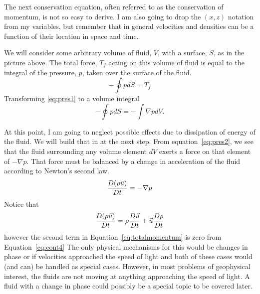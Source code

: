 \documentclass[12pt,twoside]{article}
\begin{document}
The next conservation equation, often referred to as the conservation of
momentum, is not so easy to derive.  I am also going to drop the $(x,z)$
notation from my variables, but remember that in general velocities and
densities can be a function of their location in space and time.

We will consider some arbitrary volume of fluid, $V$, with a surface,  $S$,
as in the picture above.  The total force, $T_f$ acting on this volume of fluid
is equal to the integral of the pressure, $p$, taken over the surface of the
fluid.
\begin{equation}
- \oint p dS = T_f
\label{eq:pres1}
\end{equation}
Transforming \ref{eq:pres1} to a volume integral
\begin{equation} 
- \oint p dS =  - \int \nabla p dV.
\label{eq:pres2}
\end{equation}

At this point, I am going to neglect possible effects due to dissipation of
energy of the fluid.  We will build that in at the next step.  From
equation~\ref{eq:pres2}, we see that the fluid surrounding any volume element
$dV$ exerts a force on that element of $- \nabla p$. That force must be balanced by a change in acceleration
of the fluid according to Newton's second law.   
\begin{equation}
{{D (\rho\vec u)} \over {D t}} = - \nabla p
\label{eq:euler1}
\end{equation}
Notice that 
\begin{equation} 
{{D (\rho\vec u)}\over{D t}}=\rho{{D\vec u}\over{Dt}} + \vec u {{D \rho}
\over {D t}}
\label{eq:totalmomentum}
\end{equation}
however the second term in Equation~\ref{eq:totalmomentum} is zero from
Equation~\ref{eq:cont4}  The only physical mechanisms for this would be changes
in phase or if velocities approached the speed of light and both of these cases
would (and can) be handled as special cases.   However, in most problems of
geophysical interest, the fluids are not moving at anything approaching the
speed of light.   A fluid with a change in phase could possibly be a special
topic to be covered later.
\end{document}
